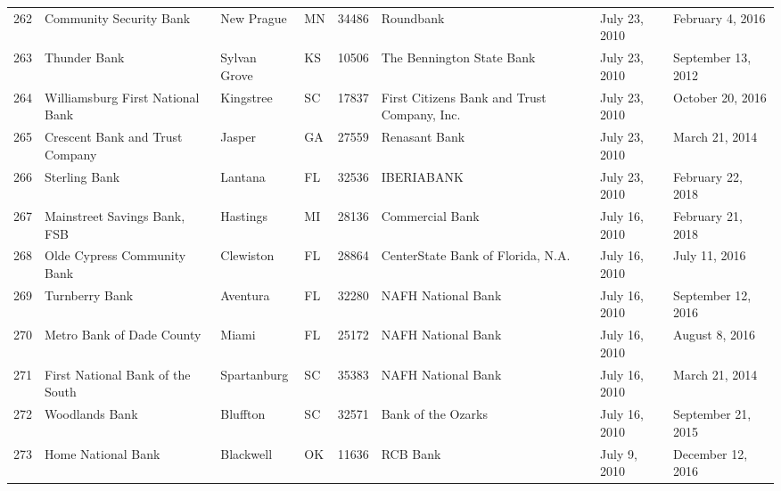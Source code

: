 \begin{tabular}{llllrlll}
262 &                            Community Security Bank &          New Prague &  MN &  34486 &                                          Roundbank &       July 23, 2010 &    February 4, 2016 \\
263 &                                       Thunder Bank &        Sylvan Grove &  KS &  10506 &                          The Bennington State Bank &       July 23, 2010 &  September 13, 2012 \\
264 &                   Williamsburg First National Bank &           Kingstree &  SC &  17837 &        First Citizens Bank and Trust Company, Inc. &       July 23, 2010 &    October 20, 2016 \\
265 &                    Crescent Bank and Trust Company &              Jasper &  GA &  27559 &                                      Renasant Bank &       July 23, 2010 &      March 21, 2014 \\
266 &                                      Sterling Bank &             Lantana &  FL &  32536 &                                         IBERIABANK &       July 23, 2010 &   February 22, 2018 \\
267 &                       Mainstreet Savings Bank, FSB &            Hastings &  MI &  28136 &                                    Commercial Bank &       July 16, 2010 &   February 21, 2018 \\
268 &                        Olde Cypress Community Bank &           Clewiston &  FL &  28864 &                  CenterState Bank of Florida, N.A. &       July 16, 2010 &       July 11, 2016 \\
269 &                                     Turnberry Bank &            Aventura &  FL &  32280 &                                 NAFH National Bank &       July 16, 2010 &  September 12, 2016 \\
270 &                          Metro Bank of Dade County &               Miami &  FL &  25172 &                                 NAFH National Bank &       July 16, 2010 &      August 8, 2016 \\
271 &                   First National Bank of the South &         Spartanburg &  SC &  35383 &                                 NAFH National Bank &       July 16, 2010 &      March 21, 2014 \\
272 &                                     Woodlands Bank &            Bluffton &  SC &  32571 &                                 Bank of the Ozarks &       July 16, 2010 &  September 21, 2015 \\
273 &                                 Home National Bank &           Blackwell &  OK &  11636 &                                           RCB Bank &        July 9, 2010 &   December 12, 2016 \\

\end{tabular}
